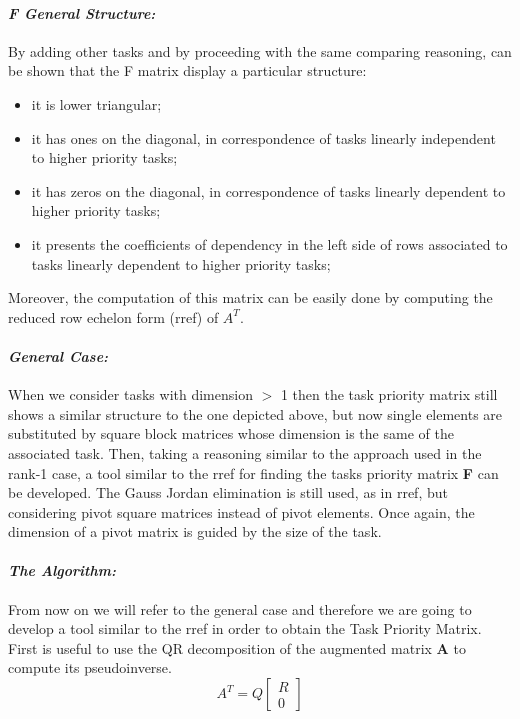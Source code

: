 \documentclass[11pt,a4paper, twocolumn, twoside]{article}
\begin{document}
\paragraph{\textit{F General Structure:}}

By adding other tasks and by proceeding with the same comparing reasoning, can be shown that the F matrix display a particular structure:
\begin{itemize}
\item it is lower triangular;
\item it has ones on the diagonal, in correspondence of tasks linearly independent to higher priority tasks;
\item it has zeros on the diagonal, in correspondence of tasks linearly dependent to higher priority tasks;
\item it presents the coefficients of dependency in the left side of rows associated to tasks linearly dependent to higher priority tasks;
\end{itemize}
Moreover, the computation of this matrix can be easily done by computing the reduced row echelon form (rref) of $A^T$.
\paragraph{\textit{General Case:}}

When we consider tasks with dimension $>$ 1 then the task priority matrix still shows a similar structure to the one depicted above, but now single elements are substituted by square block matrices whose dimension is the same of the associated task. Then, taking a reasoning similar to the approach used in the rank-1 case, a tool similar to the rref for finding the tasks priority matrix \textbf{F} can be developed. The Gauss Jordan elimination is still used, as in rref, but considering pivot square matrices instead of pivot elements. Once again, the dimension of a pivot matrix is guided by the size of
the task.

\paragraph{\textit{The Algorithm:}} 

From now on we will refer to the general case and therefore we are going to develop a tool similar to the rref in order to obtain the Task Priority Matrix.
First is useful to use the QR decomposition of the augmented matrix \textbf{A} to compute its pseudoinverse.
\[
A^T = Q\begin{bmatrix}
R\\0
\end{bmatrix}
\]
\end{document}
